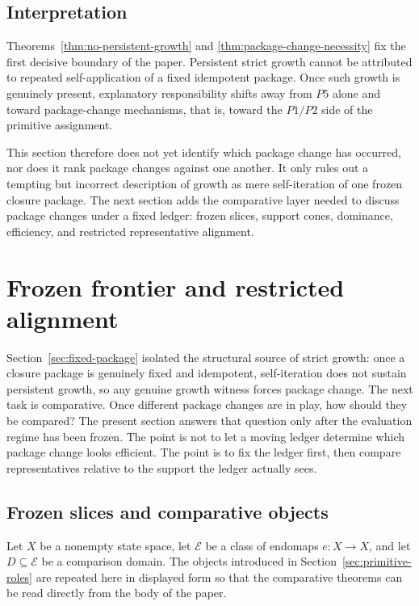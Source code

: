 \documentclass[11pt]{article}
\begin{document}
\subsection*{Interpretation}

Theorems~\ref{thm:no-persistent-growth} and \ref{thm:package-change-necessity} fix the first decisive boundary of the paper. Persistent strict growth cannot be attributed to repeated self-application of a fixed idempotent package. Once such growth is genuinely present, explanatory responsibility shifts away from \(P5\) alone and toward package-change mechanisms, that is, toward the \(P1/P2\) side of the primitive assignment.

This section therefore does not yet identify which package change has occurred, nor does it rank package changes against one another. It only rules out a tempting but incorrect description of growth as mere self-iteration of one frozen closure package. The next section adds the comparative layer needed to discuss package changes under a fixed ledger: frozen slices, support cones, dominance, efficiency, and restricted representative alignment.
 \section{Frozen frontier and restricted alignment}\label{sec:frozen-frontier}

Section~\ref{sec:fixed-package} isolated the structural source of strict growth: once a closure package is genuinely fixed and idempotent, self-iteration does not sustain persistent growth, so any genuine growth witness forces package change. The next task is comparative. Once different package changes are in play, how should they be compared? The present section answers that question only after the evaluation regime has been frozen. The point is not to let a moving ledger determine which package change looks efficient. The point is to fix the ledger first, then compare representatives relative to the support the ledger actually sees.

\subsection*{Frozen slices and comparative objects}

Let $X$ be a nonempty state space, let $\mathcal{E}$ be a class of endomaps $e\colon X\to X$, and let $D\subseteq \mathcal{E}$ be a comparison domain. The objects introduced in Section~\ref{sec:primitive-roles} are repeated here in displayed form so that the comparative theorems can be read directly from the body of the paper.
\end{document}
